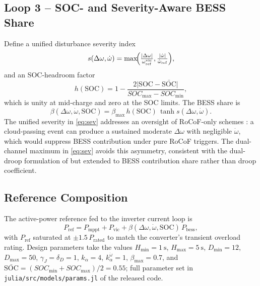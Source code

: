 \documentclass[journal]{IEEEtran}
\begin{document}
\subsection{Loop 3 -- SOC- and Severity-Aware BESS Share}
\label{subsec:beta}
Define a unified disturbance severity index
\begin{equation}
s(\Delta\omega,\dot\omega)=\max\!\Bigl(
\tfrac{|\Delta\omega|}{\omega_\mathrm{ref}^\mathrm{vic}},
\tfrac{|\dot\omega|}{\dot\omega_\mathrm{ref}}\Bigr),
\label{eq:sev}
\end{equation}
and an SOC-headroom factor
\begin{equation}
h(\mathrm{SOC})=1-\frac{2\bigl|\mathrm{SOC}-\bar{\mathrm{SOC}}\bigr|}
                       {SOC_\mathrm{max}-SOC_\mathrm{min}},
\label{eq:headroom}
\end{equation}
which is unity at mid-charge and zero at the SOC limits. The BESS
share is
\begin{equation}
\beta(\Delta\omega,\dot\omega,\mathrm{SOC})=
\beta_\mathrm{max}\,h(\mathrm{SOC})\,\tanh s(\Delta\omega,\dot\omega).
\label{eq:beta}
\end{equation}
The unified severity in \eqref{eq:sev} addresses an oversight of
RoCoF-only schemes \cite{cao2018virtual,wang2024hybrid}: a cloud-passing
event can produce a sustained moderate $\Delta\omega$ with negligible
$\dot\omega$, which would suppress BESS contribution under pure
RoCoF triggers. The dual-channel maximum in \eqref{eq:sev} avoids this
asymmetry, consistent with the dual-droop formulation of
\cite{magdy2023socrecovery,li2025socaware} but extended to BESS
contribution share rather than droop coefficient.

\subsection{Reference Composition}
The active-power reference fed to the inverter current loop is
\begin{equation}
P_\mathrm{ref}=P_\mathrm{mppt}+P_\mathrm{vic}+
\beta(\Delta\omega,\dot\omega,\mathrm{SOC})\,P_\mathrm{bess},
\label{eq:Pref}
\end{equation}
with $P_\mathrm{ref}$ saturated at $\pm 1.5\,P_\mathrm{rated}$ to
match the converter's transient overload rating. Design parameters
take the values $H_\mathrm{min}=\SI{1}{\second}$,
$H_\mathrm{max}=\SI{5}{\second}$, $D_\mathrm{min}=12$,
$D_\mathrm{max}=50$, $\gamma_J=\delta_D=1$, $k_\alpha=4$,
$k_\alpha^{\dot\omega}=1$, $\beta_\mathrm{max}=0.7$, and
$\bar{\mathrm{SOC}}=(SOC_\mathrm{min}+SOC_\mathrm{max})/2=0.55$;
full parameter set in
\texttt{julia/src/models/params.jl} of the released code.
\end{document}
